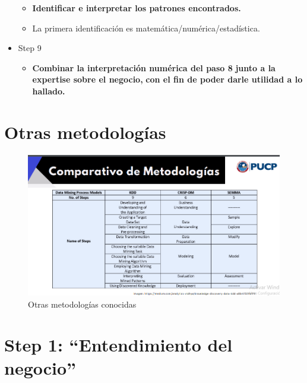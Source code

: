 \documentclass[
]{book}
\providecommand{\tightlist}{%
  \setlength{\itemsep}{0pt}\setlength{\parskip}{0pt}}
\begin{document}
\begin{itemize}
  \begin{itemize}
  \tightlist
  \item
    \textbf{Identificar e interpretar los patrones encontrados.}
  \item
    La primera identificación es matemática/numérica/estadística.
  \end{itemize}
\item
  Step 9

  \begin{itemize}
  \tightlist
  \item
    \textbf{Combinar la interpretación numérica del paso 8}
    \textbf{junto a la expertise sobre el negocio,}
    \textbf{con el fin de poder darle utilidad a lo hallado.}
  \end{itemize}
\end{itemize}

\hypertarget{otras-metodologuxedas}{%
\section{Otras metodologías}\label{otras-metodologuxedas}}

\begin{figure}

{\centering \includegraphics[width=13.18in]{images/comparacion-metodos} 

}

\caption{Otras metodologías conocidas}\label{fig:comparacion-metodos}
\end{figure}

\hypertarget{step-1-entendimiento-del-negocio}{%
\section{Step 1: ``Entendimiento del negocio''}\label{step-1-entendimiento-del-negocio}}
\end{document}

